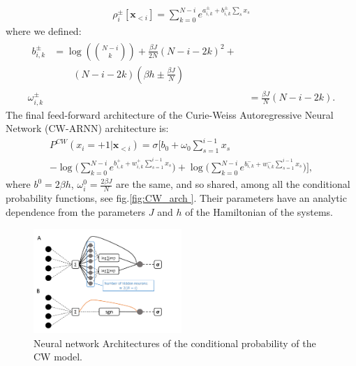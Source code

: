 \documentclass[aps,physrev,10pt,floatfix,reprint]{revtex4-2}
\begin{document}
 \begin{eqnarray*}
 \rho_i^{\pm}[\mathbf{x}_{<i}] = \sum_{k=0}^{N-i} e^{a_{i,k}^{\pm} + b_{i,k}^{\pm} \sum_s x_s} 
\end{eqnarray*}
where we defined:
\begin{align}
\label{eq:params}
\begin{split}
b_{i,k}^{\pm} & = \log\left(\binom{N-i}{k}\right) + \frac{\beta J}{2N}\left(N-i-2k\right)^{2}+ \\
& \qquad \left(N-i-2k\right)\left(\beta h \pm \frac{\beta J}{N}\right)
\end{split} \\
\omega_{i,k}^{\pm} & = \frac{\beta J}{N}\left(N-i-2k\right).
\label{eq:CW_params}
\end{align}
The final feed-forward architecture of the Curie-Weiss Autoregressive Neural Network (CW-ARNN) architecture is:
\begin{multline*}
P^{CW}\left(x_{i}=+1|\mathbf{x}_{<i}\right)  =   \sigma \bigg[b_{0}+\omega_{0}\sum_{s=1}^{i-1}x_{s}\\
-\log\big(\sum_{k=0}^{N-i}e^{b_{i,k}^{+} + 
w_{i,k}^{+}\sum_{s=1}^{i-1}x_{s}}\big)+\log\big(\sum_{k=0}^{N-i}e^{b_{i,k}^{-} + w_{i,k}^{-}\sum_{s=1}^{i-1}x_{s}}\big)\bigg],
\end{multline*}
where $b^0=2\beta h$, $\omega^0_i = \frac{2\beta J}{N}$ are the same, and so shared, among all the conditional probability functions, see fig.\ref{fig:CW_arch }. Their parameters have an analytic dependence from the parameters $J$ and $h$ of the Hamiltonian of the systems. 
\begin{figure}[!h]
    \centering 
    \includegraphics[width=0.5\textwidth]{img/CW_arch.pdf}
    \caption{Neural network Architectures of the conditional probability of the CW model.}
    \label{fig:CW_arch}
\end{figure}
\end{document}
